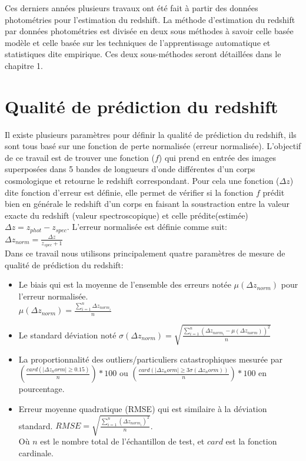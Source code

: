 Ces derniers années plusieurs  travaux \cite{Gabriel, meuphirim, isanto, photoSED, stack} ont été fait à partir des données photométries pour l'estimation du redshift. La méthode d'estimation du redshift par données photométries est divisée en deux sous méthodes à savoir celle basée modèle et celle basée sur les techniques de l'apprentissage automatique et statistiques dite empirique. Ces deux sous-méthodes seront détaillées dans le chapitre 1.

\section*{Qualité de prédiction du redshift}
Il existe plusieurs paramètres pour définir la qualité de prédiction du redshift, ils sont tous basé sur une fonction de perte normalisée (erreur normalisée). L'objectif de ce travail est de trouver une fonction ($f$) qui prend en entrée des images superposées dans 5 bandes de longueurs d'onde différentes d'un corps cosmologique et retourne le redshift correspondant. Pour cela une fonction ($\Delta z$) dite fonction d'erreur est définie, elle permet de vérifier si la fonction $f$ prédit bien en générale le redshift d'un corps en faisant la soustraction entre la valeur exacte du redshift (valeur spectroscopique) et celle prédite(estimée) $\Delta z = z_{phot} - z_{spec}$. L'erreur normalisée est définie comme suit: \\
$\Delta z_{norm} = \frac{\Delta z}{z_{spec} + 1}$ \\
Dans ce travail nous utilisons principalement quatre paramètres de mesure de qualité de prédiction du redshift: \\
\begin{itemize}
	\item Le biais qui est la moyenne de l'ensemble des erreurs notée %
	 $\mu(\Delta z_{norm})$ pour l'erreur normalisée. \\ %
	 $\mu(\Delta z_{norm}) = \frac{\sum \limits_{i=1}^{n} \Delta z_{norm_i}}{n}$
	\item Le standard déviation noté $\sigma (\Delta z_{norm}) = \sqrt{\frac{\sum \limits_{i = 1}^{n} (\Delta z_{norm_i} - \mu(\Delta z_{norm}) )^2}{n}}$ 
	\item La proportionnalité des outliers/particuliers catastrophiques mesurée par $(\frac{card(|\Delta z_norm| \geq 0.15)}{n})*100$ ou $(\frac{card(|\Delta z_norm| \geq 3\sigma(\Delta z_norm))}{n})*100$ en pourcentage. 
	\item  Erreur moyenne quadratique (RMSE) qui est similaire à la déviation standard.
	$RMSE = \sqrt{\frac{\sum \limits_{i=1}^{n} (\Delta z_{norm_i})^2}{n}}$. \\
	Où $n$ est le nombre total de l'échantillon de test, et $card$ est la fonction cardinale.
\end{itemize}
